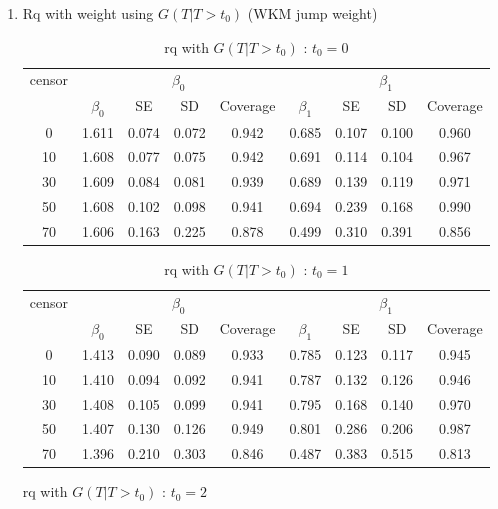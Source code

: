 \documentclass[12pt]{article}
\begin{document}
\begin{enumerate}
		\newpage
		
			\item Rq with weight using $G(T|T>t_0)$ (WKM jump weight)
		\begin{table}[hbt!]
			\caption{rq with $G(T|T>t_0)$ : $t_0=0$}
			\centering
			\begin{tabular}{|c|c|c|c|c|c|c|c|c|}
				\hline
				\multirow{2}{*}{censor} & \multicolumn{4}{c|}{$\beta_0$} & \multicolumn{4}{c|}{$\beta_1$}\\ \cline{2-9}
				& $\beta_0$ & SE & SD  & Coverage  & $\beta_1$ & SE & SD & Coverage\\
				\hline\hline
				0 & 1.611 & 0.074 & 0.072 & 0.942 & 0.685 & 0.107 & 0.100 & 0.960 \\ 
  10 & 1.608 & 0.077 & 0.075 & 0.942 & 0.691 & 0.114 & 0.104 & 0.967 \\ 
  30 & 1.609 & 0.084 & 0.081 & 0.939 & 0.689 & 0.139 & 0.119 & 0.971 \\ 
  50 & 1.608 & 0.102 & 0.098 & 0.941 & 0.694 & 0.239 & 0.168 & 0.990 \\ 
  70 & 1.606 & 0.163 & 0.225 & 0.878 & 0.499 & 0.310 & 0.391 & 0.856 \\ 
				\hline
			\end{tabular}
		\end{table}
		\begin{table}[hbt!]
			\caption{rq with $G(T|T>t_0)$ : $t_0=1$}
			\centering
			\begin{tabular}{|c|c|c|c|c|c|c|c|c|}
				\hline
				\multirow{2}{*}{censor} & \multicolumn{4}{c|}{$\beta_0$} & \multicolumn{4}{c|}{$\beta_1$}\\ \cline{2-9}
				& $\beta_0$ & SE & SD  & Coverage  & $\beta_1$ & SE & SD & Coverage\\
				\hline\hline
				0 & 1.413 & 0.090 & 0.089 & 0.933 & 0.785 & 0.123 & 0.117 & 0.945 \\ 
  10 & 1.410 & 0.094 & 0.092 & 0.941 & 0.787 & 0.132 & 0.126 & 0.946 \\ 
  30 & 1.408 & 0.105 & 0.099 & 0.941 & 0.795 & 0.168 & 0.140 & 0.970 \\ 
  50 & 1.407 & 0.130 & 0.126 & 0.949 & 0.801 & 0.286 & 0.206 & 0.987 \\ 
  70 & 1.396 & 0.210 & 0.303 & 0.846 & 0.487 & 0.383 & 0.515 & 0.813 \\ 
				\hline
			\end{tabular}
		\end{table}
		\begin{table}[hbt!]
			\caption{rq with $G(T|T>t_0)$ : $t_0=2$}

\end{table}
\end{enumerate}
\end{document}
